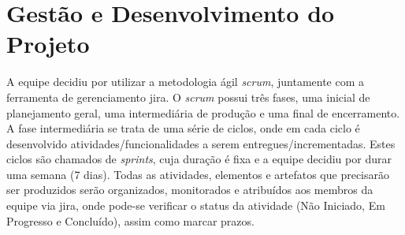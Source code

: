 \section{Gestão e Desenvolvimento do Projeto}
A equipe decidiu por utilizar a metodologia ágil \textit{\gls{scrum}}, juntamente com a ferramenta de gerenciamento \gls{jira}. O \textit{\gls{scrum}} possui três fases, uma inicial de planejamento geral, uma intermediária de produção e uma final de encerramento. A fase intermediária se trata de uma série de ciclos, onde em cada ciclo é desenvolvido atividades/funcionalidades a serem entregues/incrementadas. Estes ciclos são chamados de \textit{\glspl{sprint}}, cuja duração é fixa e a equipe decidiu por durar uma semana (7 dias). Todas as atividades, elementos e artefatos que precisarão ser produzidos serão organizados, monitorados e atribuídos aos membros da equipe via \gls{jira}, onde pode-se verificar o status da atividade (Não Iniciado, Em Progresso e Concluído), assim como marcar prazos.